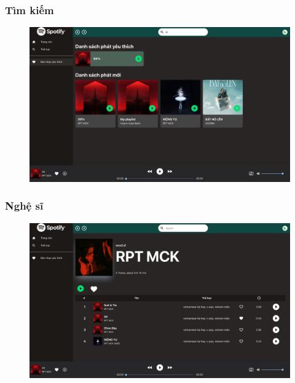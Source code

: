 \documentclass[a4paper]{article}
\begin{document}
\subsubsection{Tìm kiếm}
\begin{figure}[h!]
\begin{center}
\includegraphics[width=12cm]{searching.png}
\end{center}
\end{figure}
\newpage

\subsubsection{Nghệ sĩ}
\begin{figure}[h!]
\begin{center}
\includegraphics[width=12cm]{artist.png}
\end{center}
\end{figure}
\end{document}
